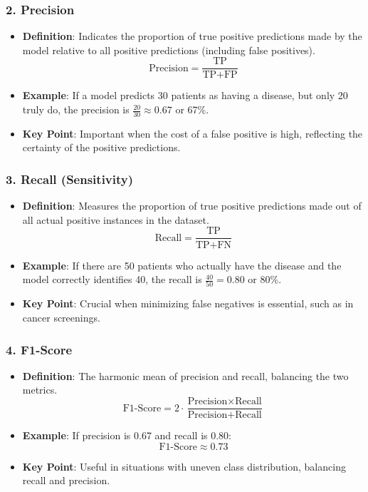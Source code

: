 \documentclass[aspectratio=169]{beamer}
\begin{document}
\begin{frame}[fragile]
    \frametitle{2. Precision}
    \begin{itemize}
        \item \textbf{Definition}: Indicates the proportion of true positive predictions made by the model relative to all positive predictions (including false positives).
        \begin{equation}
            \text{Precision} = \frac{\text{TP}}{\text{TP} + \text{FP}}
        \end{equation}
        \item \textbf{Example}: If a model predicts 30 patients as having a disease, but only 20 truly do, the precision is \( \frac{20}{30} \approx 0.67 \) or 67\%.
        \item \textbf{Key Point}: Important when the cost of a false positive is high, reflecting the certainty of the positive predictions.
    \end{itemize}
\end{frame}

\begin{frame}[fragile]
    \frametitle{3. Recall (Sensitivity)}
    \begin{itemize}
        \item \textbf{Definition}: Measures the proportion of true positive predictions made out of all actual positive instances in the dataset.
        \begin{equation}
            \text{Recall} = \frac{\text{TP}}{\text{TP} + \text{FN}}
        \end{equation}
        \item \textbf{Example}: If there are 50 patients who actually have the disease and the model correctly identifies 40, the recall is \( \frac{40}{50} = 0.80 \) or 80\%.
        \item \textbf{Key Point}: Crucial when minimizing false negatives is essential, such as in cancer screenings.
    \end{itemize}
\end{frame}

\begin{frame}[fragile]
    \frametitle{4. F1-Score}
    \begin{itemize}
        \item \textbf{Definition}: The harmonic mean of precision and recall, balancing the two metrics.
        \begin{equation}
            \text{F1-Score} = 2 \cdot \frac{\text{Precision} \times \text{Recall}}{\text{Precision} + \text{Recall}}
        \end{equation}
        \item \textbf{Example}: If precision is 0.67 and recall is 0.80:
        \begin{equation}
            \text{F1-Score} \approx 0.73
        \end{equation}
        \item \textbf{Key Point}: Useful in situations with uneven class distribution, balancing recall and precision.
    \end{itemize}
\end{frame}
\end{document}
